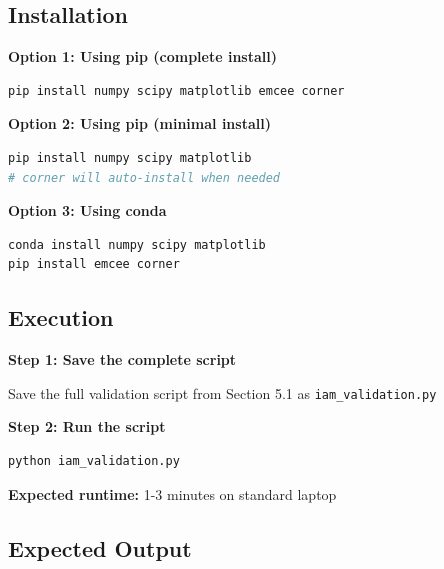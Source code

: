 \documentclass[11pt]{article}
\begin{document}
\subsection{Installation}

\textbf{Option 1: Using pip (complete install)}
\begin{lstlisting}[language=bash]
pip install numpy scipy matplotlib emcee corner
\end{lstlisting}

\textbf{Option 2: Using pip (minimal install)}
\begin{lstlisting}[language=bash]
pip install numpy scipy matplotlib
# corner will auto-install when needed
\end{lstlisting}

\textbf{Option 3: Using conda}
\begin{lstlisting}[language=bash]
conda install numpy scipy matplotlib
pip install emcee corner
\end{lstlisting}

\subsection{Execution}

\textbf{Step 1: Save the complete script}

Save the full validation script from Section 5.1 as \texttt{iam\_validation.py}

\textbf{Step 2: Run the script}
\begin{lstlisting}[language=bash]
python iam_validation.py
\end{lstlisting}

\textbf{Expected runtime:} 1-3 minutes on standard laptop

\subsection{Expected Output}
\end{document}
